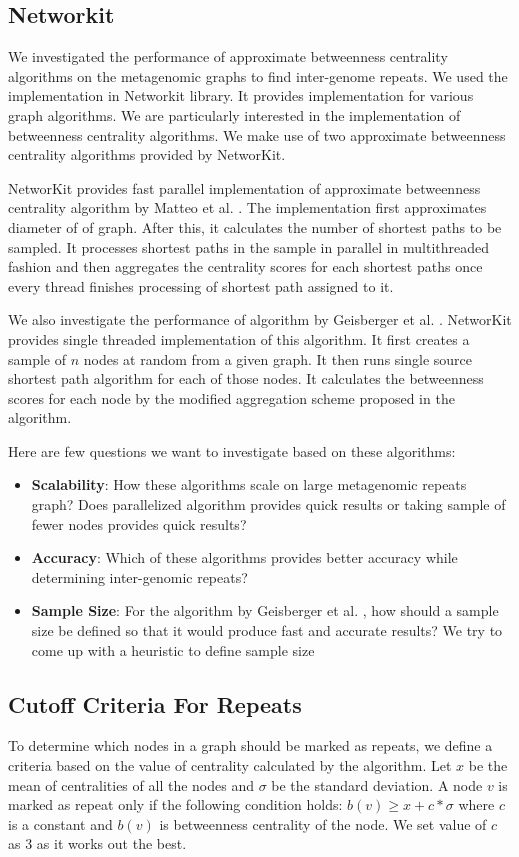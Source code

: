 \documentclass[runningheads,a4paper]{llncs}
\begin{document}
\subsection*{Networkit}
We investigated the performance of approximate betweenness centrality algorithms on the metagenomic graphs to find inter-genome repeats. We used the implementation in Networkit\cite{networkit} library. It provides implementation for various graph algorithms. We are particularly interested in the implementation of betweenness centrality algorithms. We make use of two approximate betweenness centrality algorithms provided by NetworKit. 

NetworKit provides fast parallel implementation of approximate betweenness centrality algorithm by Matteo et al. \cite{matteo}. The implementation first approximates diameter of of graph. After this, it calculates the number of shortest paths to be sampled. It processes shortest paths in the sample in parallel in multithreaded fashion and then aggregates the centrality scores for each shortest paths once every thread finishes processing of shortest path assigned to it. 

We also investigate the performance of algorithm by Geisberger et al. \cite{sanders}. NetworKit provides single threaded implementation of this algorithm. It first creates a sample of $n$ nodes at random from a given graph. It then runs single source shortest path algorithm for each of those nodes. It calculates the betweenness scores for each node by the modified aggregation scheme proposed in the algorithm. 

Here are few questions we want to investigate based on these algorithms:

\begin{itemize}
\item \textbf{Scalability}: How these algorithms scale on large metagenomic repeats graph? Does parallelized algorithm provides quick results or taking sample of fewer nodes provides quick results?
\item \textbf{Accuracy}: Which of these algorithms provides better accuracy while determining inter-genomic repeats?
\item \textbf{Sample Size}: For the algorithm by Geisberger et al. \cite{sanders}, how should a sample size be defined so that it would produce fast and accurate results? We try to come up with a heuristic to define sample size
\end{itemize}


\subsection*{Cutoff Criteria For Repeats}
To determine which nodes in a graph should be marked as repeats, we define a criteria based on the value of centrality calculated by the algorithm. Let $x$ be the mean of centralities of all the nodes and $\sigma$ be the standard deviation. A node $v$ is marked as repeat only if the following condition holds: $b(v) \geq x + c*\sigma$ where $c$ is a constant and $b(v)$ is betweenness centrality of the node. We set value of $c$ as 3 as it works out the best.
\end{document}

